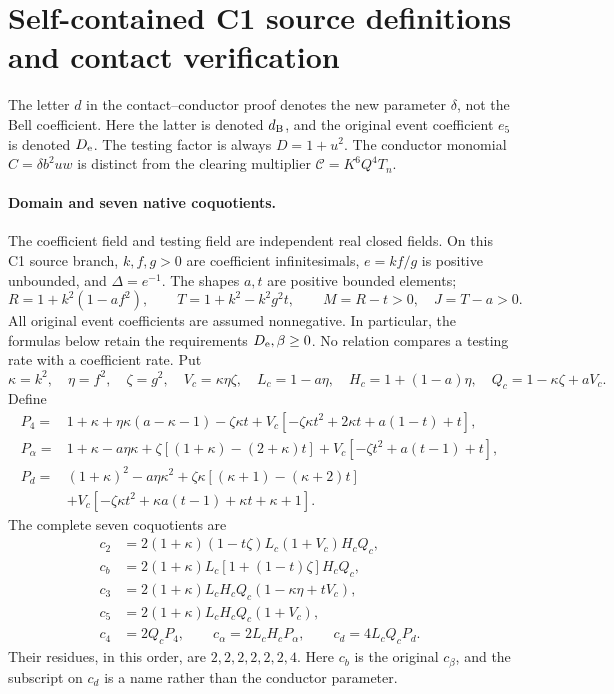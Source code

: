 \section{Self-contained C1 source definitions and contact verification}
\label{app:c1-source-definitions}

The letter $d$ in the contact--conductor proof denotes the new parameter
$\delta$, not the Bell coefficient. Here the latter is denoted $d_{\rm B}$,
and the original event coefficient $e_5$ is denoted $D_{\rm e}$.
The testing factor is always $D=1+u^2$. The conductor monomial
$C=\delta b^2uw$ is distinct from the clearing multiplier
$\mathcal C=K^6Q^4T_n$.

\paragraph{Domain and seven native coquotients.}
The coefficient field and testing field are independent real closed
fields. On this C1 source branch, $k,f,g>0$ are coefficient
infinitesimals, $e=kf/g$ is positive unbounded, and
$\Delta=e^{-1}$. The shapes $a,t$ are positive bounded elements;
\[
 R=1+k^2(1-af^2),\qquad T=1+k^2-k^2g^2t,
 \qquad M=R-t>0,\quad J=T-a>0.
\]
All original event coefficients are assumed nonnegative. In particular,
the formulas below retain the requirements $D_{\rm e},\beta\ge0$.
No relation compares a testing rate with a coefficient rate.
Put
\[
 \kappa=k^2,\quad \eta=f^2,\quad \zeta=g^2,
 \quad V_c=\kappa\eta\zeta,\quad
 L_c=1-a\eta,\quad H_c=1+(1-a)\eta,\quad Q_c=1-\kappa\zeta+aV_c.
\]
Define
\begin{align*}
P_4={}&1+\kappa+\eta\kappa(a-\kappa-1)-\zeta\kappa t
 +V_c[-\zeta\kappa t^2+2\kappa t+a(1-t)+t],\\
P_\alpha={}&1+\kappa-a\eta\kappa
 +\zeta[(1+\kappa)-(2+\kappa)t]
 +V_c[-\zeta t^2+a(t-1)+t],\\
P_d={}&(1+\kappa)^2-a\eta\kappa^2
 +\zeta\kappa[(\kappa+1)-(\kappa+2)t]\\
 &+V_c[-\zeta\kappa t^2+\kappa a(t-1)+\kappa t+\kappa+1].
\end{align*}
The complete seven coquotients are
\begin{align*}
c_2&=2(1+\kappa)(1-t\zeta)L_c(1+V_c)H_cQ_c,\\
c_b&=2(1+\kappa)L_c[1+(1-t)\zeta]H_cQ_c,\\
c_3&=2(1+\kappa)L_cH_cQ_c(1-\kappa\eta+tV_c),\\
c_5&=2(1+\kappa)L_cH_cQ_c(1+V_c),\\
c_4&=2Q_cP_4,\qquad c_\alpha=2L_cH_cP_\alpha,
 \qquad c_d=4L_cQ_cP_d.
\end{align*}
Their residues, in this order, are $2,2,2,2,2,2,4$.
Here $c_b$ is the original $c_\beta$, and the subscript on $c_d$ is a
name rather than the conductor parameter.

